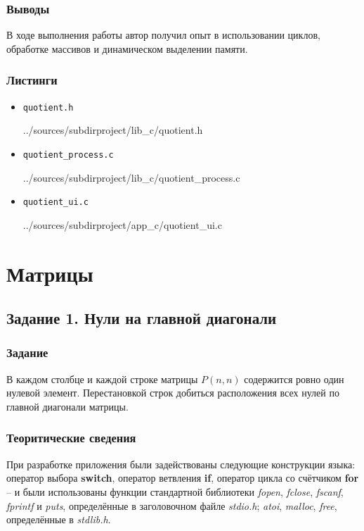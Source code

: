 \documentclass[12pt,a4paper]{report}
\begin{document}
\subsection{Выводы}
\hspace{\parindent}
В ходе выполнения работы автор получил опыт в использовании циклов, обработке массивов и динамическом выделении памяти.
\subsection*{Листинги}
\begin{itemize}
\item[] \verb-quotient.h-

{../sources/subdirproject/lib_c/quotient.h}
\item[] \verb-quotient_process.c-

{../sources/subdirproject/lib_c/quotient_process.c}
\item[] \verb-quotient_ui.c-

{../sources/subdirproject/app_c/quotient_ui.c}
\end{itemize}

%
\chapter{Матрицы}
\section{Задание 1. Нули на главной диагонали}
\subsection{Задание}
\hspace{\parindent}
В каждом столбце и каждой строке матрицы $P(n,n)$ содержится ровно один нулевой элемент. Перестановкой строк добиться расположения всех нулей по главной диагонали матрицы.
\subsection{Теоритические сведения}
\hspace{\parindent}
При разработке приложения были задействованы следующие конструкции языка: оператор выбора \textbf{switch}, оператор ветвления \textbf{if}, оператор цикла со счётчиком \textbf{for} -- и были использованы функции стандартной библиотеки \textit{fopen}, \textit{fclose}, \textit{fscanf}, \textit{fprintf} и \textit{puts}, определённые в заголовочном файле \textit{stdio.h}; \textit{atoi}, \textit{malloc}, \textit{free}, определённые в \textit{stdlib.h}.
\end{document}

